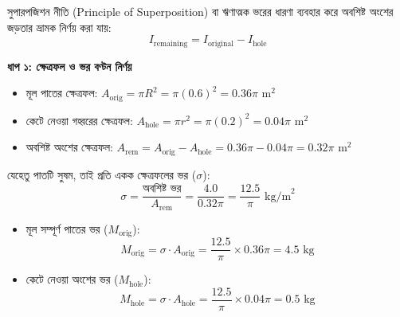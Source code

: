 \documentclass[12pt, a4paper]{article}
\begin{document}
\begin{tcolorbox}[solutionbox={সমাধান (Solution)}]
\noindent
সুপারপজিশন নীতি (Principle of Superposition) বা ঋণাত্মক ভরের ধারণা ব্যবহার করে অবশিষ্ট অংশের জড়তার ভ্রামক নির্ণয় করা যায়: 
$$I_{\text{remaining}} = I_{\text{original}} - I_{\text{hole}}$$

\vspace{0.5em}
\noindent
\textbf{ধাপ ১: ক্ষেত্রফল ও ভর বণ্টন নির্ণয়} \\
\begin{itemize}[leftmargin=*, parsep=0.3ex]
    \item মূল পাতের ক্ষেত্রফল: $A_{\text{orig}} = \pi R^2 = \pi (0.6)^2 = 0.36\pi\text{ m}^2$
    \item কেটে নেওয়া গহ্বরের ক্ষেত্রফল: $A_{\text{hole}} = \pi r^2 = \pi (0.2)^2 = 0.04\pi\text{ m}^2$
    \item অবশিষ্ট অংশের ক্ষেত্রফল: $A_{\text{rem}} = A_{\text{orig}} - A_{\text{hole}} = 0.36\pi - 0.04\pi = 0.32\pi\text{ m}^2$
\end{itemize}

যেহেতু পাতটি সুষম, তাই প্রতি একক ক্ষেত্রফলের ভর ($\sigma$):
$$\sigma = \frac{\text{অবশিষ্ট ভর}}{A_{\text{rem}}} = \frac{4.0}{0.32\pi} = \frac{12.5}{\pi}\text{ kg/m}^2$$

\begin{itemize}[leftmargin=*, parsep=0.3ex]
    \item মূল সম্পূর্ণ পাতের ভর ($M_{\text{orig}}$): 
    $$M_{\text{orig}} = \sigma \cdot A_{\text{orig}} = \frac{12.5}{\pi} \times 0.36\pi = 4.5\text{ kg}$$
    \item কেটে নেওয়া অংশের ভর ($M_{\text{hole}}$): 
    $$M_{\text{hole}} = \sigma \cdot A_{\text{hole}} = \frac{12.5}{\pi} \times 0.04\pi = 0.5\text{ kg}$$
\end{itemize}

\vspace{1em}
\begin{center}
\end{center}
\end{tcolorbox}
\end{document}
